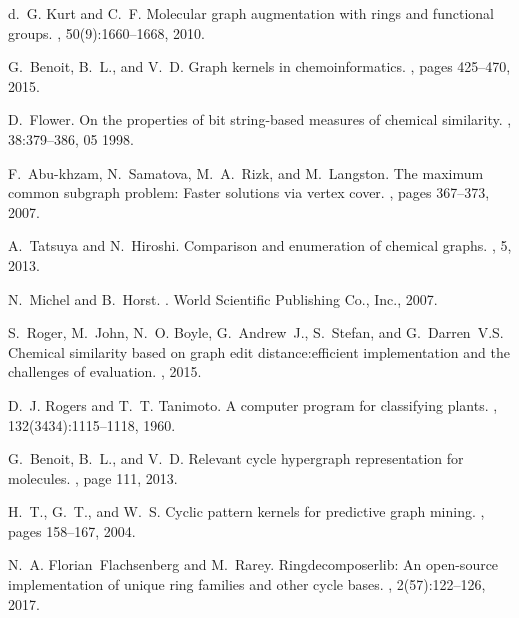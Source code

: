 \documentclass[10pt,letterpaper]{article}
\begin{document}
\begin{thebibliography}{10}
d.~G. Kurt and C.~F.
\newblock Molecular graph augmentation with rings and functional groups.
, 50(9):1660--1668, 2010.

G.~Benoit, B.~L., and V.~D.
\newblock Graph kernels in chemoinformatics.
, pages 425--470, 2015.

D.~Flower.
\newblock On the properties of bit string-based measures of chemical
  similarity.
,
  38:379--386, 05 1998.

F.~Abu-khzam, N.~Samatova, M.~A.~Rizk, and M.~Langston.
\newblock The maximum common subgraph problem: Faster solutions via vertex
  cover.
, pages 367--373, 2007.

A.~Tatsuya and N.~Hiroshi.
\newblock Comparison and enumeration of chemical graphs.
, 5, 2013.

N.~Michel and B.~Horst.
.
\newblock World Scientific Publishing Co., Inc., 2007.

S.~Roger, M.~John, N.~O. Boyle, G.~Andrew~J., S.~Stefan, and G.~Darren~V.S.
\newblock Chemical similarity based on graph edit distance:efficient
  implementation and the challenges of evaluation.
, 2015.

D.~J. Rogers and T.~T. Tanimoto.
\newblock A computer program for classifying plants.
, 132(3434):1115--1118, 1960.

G.~Benoit, B.~L., and V.~D.
\newblock Relevant cycle hypergraph representation for molecules.
, page 111, 2013.


H.~T., G.~T., and W.~S.
\newblock Cyclic pattern kernels for predictive graph mining.
, pages 158--167, 2004.

N.~A. Florian~Flachsenberg and M.~Rarey.
\newblock Ringdecomposerlib: An open-source implementation of unique ring
  families and other cycle bases.
, 2(57):122--126, 2017.


\end{thebibliography}
\end{document}
